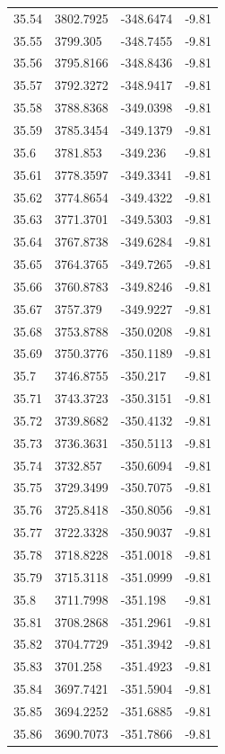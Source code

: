 \begin{table}[H]
\begin{tabular}{llll}
35.54 & 3802.7925 & -348.6474 & -9.81 \\
35.55 & 3799.305 & -348.7455 & -9.81 \\
35.56 & 3795.8166 & -348.8436 & -9.81 \\
35.57 & 3792.3272 & -348.9417 & -9.81 \\
35.58 & 3788.8368 & -349.0398 & -9.81 \\
35.59 & 3785.3454 & -349.1379 & -9.81 \\
35.6 & 3781.853 & -349.236 & -9.81 \\
35.61 & 3778.3597 & -349.3341 & -9.81 \\
35.62 & 3774.8654 & -349.4322 & -9.81 \\
35.63 & 3771.3701 & -349.5303 & -9.81 \\
35.64 & 3767.8738 & -349.6284 & -9.81 \\
35.65 & 3764.3765 & -349.7265 & -9.81 \\
35.66 & 3760.8783 & -349.8246 & -9.81 \\
35.67 & 3757.379 & -349.9227 & -9.81 \\
35.68 & 3753.8788 & -350.0208 & -9.81 \\
35.69 & 3750.3776 & -350.1189 & -9.81 \\
35.7 & 3746.8755 & -350.217 & -9.81 \\
35.71 & 3743.3723 & -350.3151 & -9.81 \\
35.72 & 3739.8682 & -350.4132 & -9.81 \\
35.73 & 3736.3631 & -350.5113 & -9.81 \\
35.74 & 3732.857 & -350.6094 & -9.81 \\
35.75 & 3729.3499 & -350.7075 & -9.81 \\
35.76 & 3725.8418 & -350.8056 & -9.81 \\
35.77 & 3722.3328 & -350.9037 & -9.81 \\
35.78 & 3718.8228 & -351.0018 & -9.81 \\
35.79 & 3715.3118 & -351.0999 & -9.81 \\
35.8 & 3711.7998 & -351.198 & -9.81 \\
35.81 & 3708.2868 & -351.2961 & -9.81 \\
35.82 & 3704.7729 & -351.3942 & -9.81 \\
35.83 & 3701.258 & -351.4923 & -9.81 \\
35.84 & 3697.7421 & -351.5904 & -9.81 \\
35.85 & 3694.2252 & -351.6885 & -9.81 \\
35.86 & 3690.7073 & -351.7866 & -9.81 \\

\end{tabular}
\end{table}
